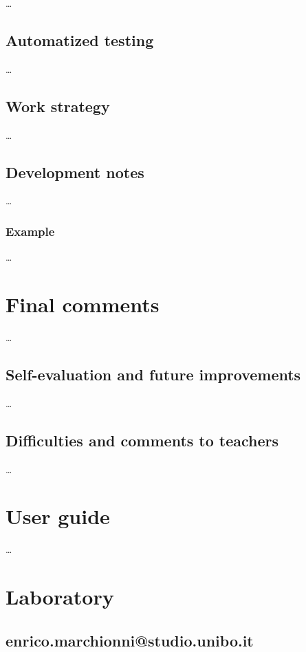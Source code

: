 \documentclass[12pt, a4paper]{report}
\begin{document}
    \dots

\section{Automatized testing}

    \dots

\section{Work strategy}

    \dots

\section{Development notes}

    \dots

\subsection{Example}

    \dots

\chapter{Final comments}

    \dots

\section{Self-evaluation and future improvements}

    \dots

\section{Difficulties and comments to teachers}

    \dots

\appendix

\chapter{User guide}

    \dots

\chapter{Laboratory}

\section{enrico.marchionni@studio.unibo.it}
\end{document}
